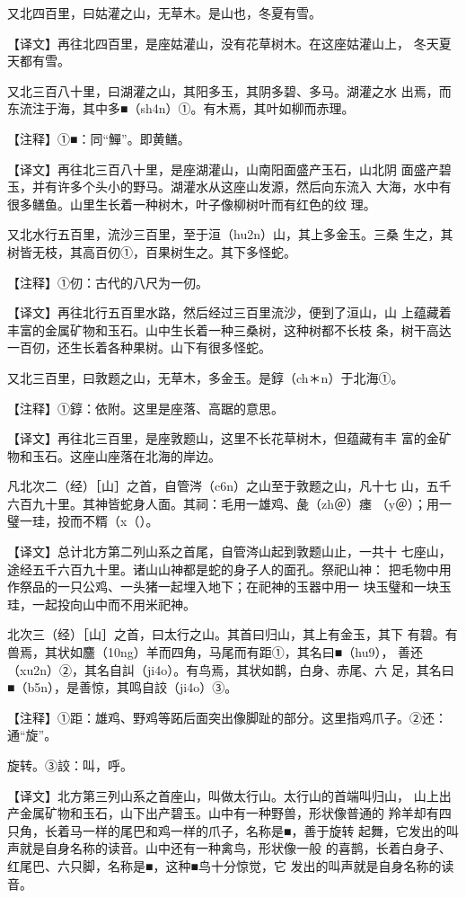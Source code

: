 \documentclass[a4paper,12pt,UTF8,twoside]{ctexbook}
\begin{document}
又北四百里，曰姑灌之山，无草木。是山也，冬夏有雪。

【译文】再往北四百里，是座姑灌山，没有花草树木。在这座姑灌山上， 冬天夏天都有雪。

又北三百八十里，曰湖灌之山，其阳多玉，其阴多碧、多马。湖灌之水 出焉，而东流注于海，其中多■（sh4n）①。有木焉，其叶如柳而赤理。

【注释】①■：同“鱓”。即黄鳝。

【译文】再往北三百八十里，是座湖灌山，山南阳面盛产玉石，山北阴 面盛产碧玉，并有许多个头小的野马。湖灌水从这座山发源，然后向东流入 大海，水中有很多鳝鱼。山里生长着一种树木，叶子像柳树叶而有红色的纹 理。

又北水行五百里，流沙三百里，至于洹（hu2n）山，其上多金玉。三桑 生之，其树皆无枝，其高百仞①，百果树生之。其下多怪蛇。

【注释】①仞：古代的八尺为一仞。

【译文】再往北行五百里水路，然后经过三百里流沙，便到了洹山，山 上蕴藏着丰富的金属矿物和玉石。山中生长着一种三桑树，这种树都不长枝 条，树干高达一百仞，还生长着各种果树。山下有很多怪蛇。

又北三百里，曰敦题之山，无草木，多金玉。是錞（ch＊n）于北海①。

【注释】①錞：依附。这里是座落、高踞的意思。

【译文】再往北三百里，是座敦题山，这里不长花草树木，但蕴藏有丰 富的金矿物和玉石。这座山座落在北海的岸边。

凡北次二（经）［山］之首，自管涔（c6n）之山至于敦题之山，凡十七 山，五千六百九十里。其神皆蛇身人面。其祠：毛用一雄鸡、彘（zh＠）瘗 （y＠）；用一璧一珪，投而不糈（x（）。

【译文】总计北方第二列山系之首尾，自管涔山起到敦题山止，一共十 七座山，途经五千六百九十里。诸山山神都是蛇的身子人的面孔。祭祀山神： 把毛物中用作祭品的一只公鸡、一头猪一起埋入地下；在祀神的玉器中用一 块玉璧和一块玉珪，一起投向山中而不用米祀神。

北次三（经）［山］之首，曰太行之山。其首曰归山，其上有金玉，其下 有碧。有兽焉，其状如麢（10ng）羊而四角，马尾而有距①，其名曰■（hu9）， 善还（xu2n）②，其名自訆（ji4o）。有鸟焉，其状如鹊，白身、赤尾、六 足，其名曰■（b5n），是善惊，其鸣自詨（ji4o）③。

【注释】①距：雄鸡、野鸡等跖后面突出像脚趾的部分。这里指鸡爪子。②还：通“旋”。

旋转。③詨：叫，呼。

【译文】北方第三列山系之首座山，叫做太行山。太行山的首端叫归山， 山上出产金属矿物和玉石，山下出产碧玉。山中有一种野兽，形状像普通的 羚羊却有四只角，长着马一样的尾巴和鸡一样的爪子，名称是■，善于旋转 起舞，它发出的叫声就是自身名称的读音。山中还有一种禽鸟，形状像一般 的喜鹊，长着白身子、红尾巴、六只脚，名称是■，这种■鸟十分惊觉，它 发出的叫声就是自身名称的读音。
\end{document}

